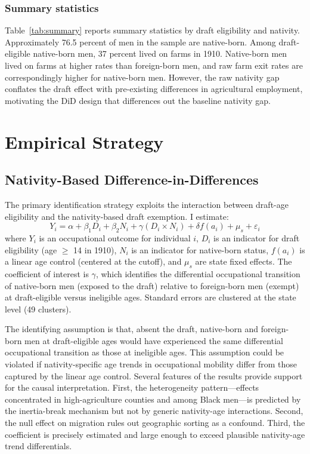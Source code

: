 \documentclass[12pt]{article}
\begin{document}
\subsubsection*{Summary statistics} Table~\ref{tab:summary} reports summary statistics by draft eligibility and nativity. Approximately 76.5 percent of men in the sample are native-born. Among draft-eligible native-born men, 37 percent lived on farms in 1910. Native-born men lived on farms at higher rates than foreign-born men, and raw farm exit rates are correspondingly higher for native-born men. However, the raw nativity gap conflates the draft effect with pre-existing differences in agricultural employment, motivating the DiD design that differences out the baseline nativity gap.



\section{Empirical Strategy}

\subsection{Nativity-Based Difference-in-Differences}

The primary identification strategy exploits the interaction between draft-age eligibility and the nativity-based draft exemption. I estimate:
\begin{equation}
Y_i = \alpha + \beta_1 D_i + \beta_2 N_i + \gamma (D_i \times N_i) + \delta f(a_i) + \mu_s + \varepsilon_i
\label{eq:did}
\end{equation}
where $Y_i$ is an occupational outcome for individual $i$, $D_i$ is an indicator for draft eligibility (age $\geq$ 14 in 1910), $N_i$ is an indicator for native-born status, $f(a_i)$ is a linear age control (centered at the cutoff), and $\mu_s$ are state fixed effects. The coefficient of interest is $\gamma$, which identifies the differential occupational transition of native-born men (exposed to the draft) relative to foreign-born men (exempt) at draft-eligible versus ineligible ages. Standard errors are clustered at the state level (49 clusters).

The identifying assumption is that, absent the draft, native-born and foreign-born men at draft-eligible ages would have experienced the same differential occupational transition as those at ineligible ages. This assumption could be violated if nativity-specific age trends in occupational mobility differ from those captured by the linear age control. Several features of the results provide support for the causal interpretation. First, the heterogeneity pattern---effects concentrated in high-agriculture counties and among Black men---is predicted by the inertia-break mechanism but not by generic nativity-age interactions. Second, the null effect on migration rules out geographic sorting as a confound. Third, the coefficient is precisely estimated and large enough to exceed plausible nativity-age trend differentials.
\end{document}
